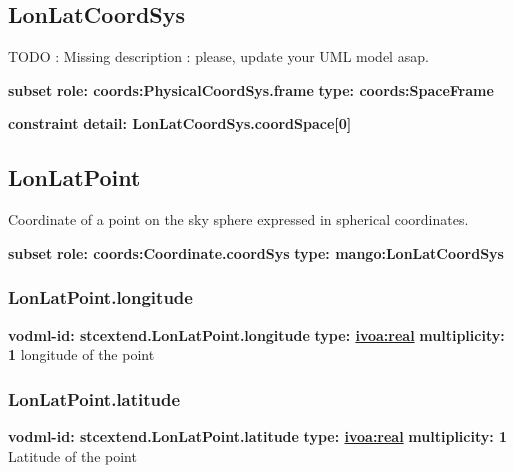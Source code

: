   \subsection{LonLatCoordSys}
  \label{sect:stcextend.LonLatCoordSys}
    TODO : Missing description : please, update your UML model asap.

    \noindent \textbf{subset} \newline
    \indent   \textbf{role: coords:PhysicalCoordSys.frame} \newline
    \indent   \textbf{type: coords:SpaceFrame} \newline


    \noindent \textbf{constraint} \newline
    \indent    \textbf{detail: LonLatCoordSys.coordSpace[0] }\newline


  \subsection{LonLatPoint}
  \label{sect:stcextend.LonLatPoint}
    Coordinate of a point on the sky sphere expressed in spherical coordinates.

    \noindent \textbf{subset} \newline
    \indent   \textbf{role: coords:Coordinate.coordSys} \newline
    \indent   \textbf{type: mango:LonLatCoordSys} \newline


    \subsubsection{LonLatPoint.longitude}
      \textbf{vodml-id: stcextend.LonLatPoint.longitude} \newline
      \textbf{type: \hyperref[sect:ivoa]{ivoa:real}} \newline
      \textbf{multiplicity: 1} \newline 
      longitude of the point

    \subsubsection{LonLatPoint.latitude}
      \textbf{vodml-id: stcextend.LonLatPoint.latitude} \newline
      \textbf{type: \hyperref[sect:ivoa]{ivoa:real}} \newline
      \textbf{multiplicity: 1} \newline 
      Latitude of the point

